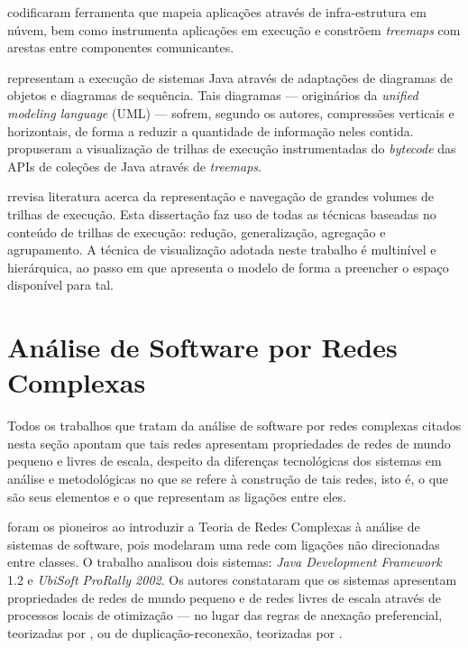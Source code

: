  codificaram ferramenta que mapeia aplicações
através de infra-estrutura em núvem, bem como instrumenta aplicações em execução
e constrõem \textit{treemaps} com arestas entre componentes comunicantes.

 representam a execução de sistemas Java
através de adaptações de diagramas de objetos e diagramas de sequência.
Tais diagramas --- originários da \textit{unified modeling language} (UML) ---
sofrem, segundo os autores, compressões verticais e horizontais, de forma a
reduzir a quantidade de informação neles contida.
 propuseram a visualização de trilhas de
execução instrumentadas do \textit{bytecode} das APIs de coleções de Java
através de \textit{treemaps}. 

 rrevisa literatura acerca da representação e
navegação de grandes volumes de trilhas de execução. Esta dissertação faz uso de
todas as técnicas baseadas no conteúdo de trilhas de execução: redução,
generalização, agregação e agrupamento. A técnica de visualização adotada neste
trabalho é multinível e hierárquica, ao passo em que apresenta o modelo de forma
a preencher o espaço disponível para tal.

\section{Análise de Software por Redes Complexas}
\label{sec:SoftwareComplexNetworks}

Todos os trabalhos que tratam da análise de software por redes complexas citados
nesta seção apontam que tais redes apresentam propriedades de redes de mundo
pequeno e livres de escala, despeito da diferenças tecnológicas dos sistemas em
análise e metodológicas no que se refere à construção de tais redes, isto é, o
que são seus elementos e o que representam as ligações entre eles.

 foram os pioneiros ao introduzir a Teoria de
Redes Complexas à análise de sistemas de software, pois modelaram uma rede com
ligações não direcionadas entre classes. O trabalho analisou dois sistemas:
\textit{Java Development Framework} 1.2 e \textit{UbiSoft ProRally 2002}.
Os autores constataram que os sistemas apresentam propriedades de redes de mundo
pequeno e de redes livres de escala através de processos locais de otimização
--- no lugar das regras de anexação preferencial, teorizadas por
, ou de duplicação-reconexão,
teorizadas por .

